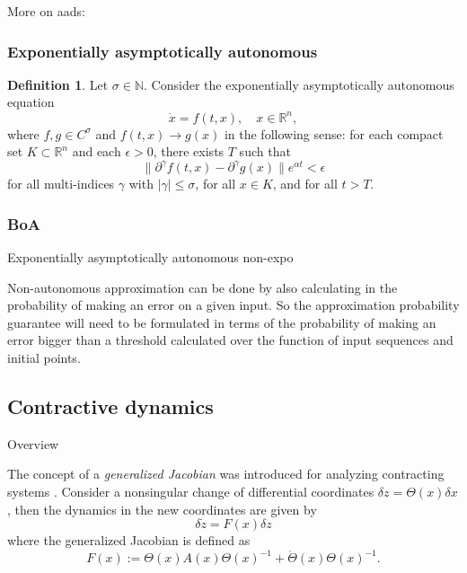 \documentclass{article}
\theoremstyle{definition} \newtheorem{definition}{Definition}
\theoremstyle{remark} \newtheorem{remark}{Remark}
\newcounter{ct}
\begin{document}
More on aads: \citep{wieczorek2021compactification}

\subsubsection{Exponentially asymptotically autonomous}
\begin{definition}\label{def:eaa}
Let \(\sigma \in \mathbb{N}\). Consider the exponentially asymptotically autonomous equation  
\[
\dot{x} = f(t,x), \quad x \in \mathbb{R}^n,
\]
where \( f, g \in C^\sigma \) and \( f(t,x) \to g(x) \) in the following sense: for each compact set \( K \subset \mathbb{R}^n \) and each \( \epsilon > 0 \), there exists \( T \) such that  
\[
\|\partial^\gamma f(t,x) - \partial^\gamma g(x)\| e^{\alpha t} < \epsilon
\]
for all multi-indices \( \gamma \) with \( |\gamma| \leq \sigma \), for all \( x \in K \), and for all \( t > T \).

\end{definition}

\subsubsection{BoA}
Exponentially asymptotically autonomous \citep{giesl2011numerical}
non-expo \citep{giesl2012numerical}

Non-autonomous approximation can be done by also calculating in the probability of making an error on a given input.
So the approximation probability guarantee will need to be formulated in terms of the probability of making an error bigger than a threshold calculated over the function of input sequences and initial points.




\subsection{Contractive dynamics}\label{sec:contractive}

Overview \citep{aminzare2014contraction, tsukamoto2021contraction}

The concept of a \textit{generalized Jacobian} was introduced for analyzing contracting systems \citep{lohmiller1998contraction}.
Consider a nonsingular change of differential coordinates \( \delta z = \Theta(x) \delta x \), then the dynamics in the new coordinates are given by
\[
\delta\dot{ z} = F(x) \delta z
\]
where the generalized Jacobian is defined as
\[
F(x) := \Theta(x) A(x) \Theta(x)^{-1} + \dot{\Theta}(x) \Theta(x)^{-1}.
\]
\end{document}
